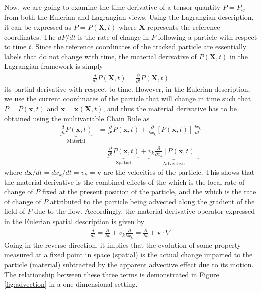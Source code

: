 Now, we are going to examine the time derivative of a tensor quantity $P = P_{ij\ldots}$ from both the Eulerian and Lagrangian views. Using the Lagrangian description, it can be expressed as $P = P(\textbf{X}, t)$ where $\textbf{X}$ represents the reference coordinates. The  $dP/dt$ is the rate of change in $P$ following a particle with respect to time $t$. Since the reference coordinates of the tracked particle are essentially labels that do not change with time, the material derivative of $P(\textbf{X}, t)$ in the Lagrangian framework is simply
\begin{align}
\frac{d}{dt} P(\textbf{X},t) = \frac{\partial}{\partial t} P(\textbf{X},t) \label{eqn:lagpartialt}
\end{align}
its partial derivative with respect to time. However, in the Eulerian description, we use the current coordinates of the particle that will change in time such that $P = P(\textbf{x}, t)$ and $\textbf{x} = \textbf{x}(\textbf{X}, t)$, and thus the material derivative has to be obtained using the multivariable Chain Rule as
\begin{align}
\underbrace{\frac{d}{dt} P(\textbf{x},t)}_{\text{Material}} &= \frac{\partial}{\partial t} P(\textbf{x},t) + \frac{\partial}{\partial x_k} [P(\textbf{x},t)] \frac{dx_k}{dt} \nonumber \\
&= \underbrace{\frac{\partial}{\partial t} P(\textbf{x},t)}_{\text{Spatial}} + \underbrace{v_k\frac{\partial}{\partial x_k} [P(\textbf{x},t)]}_{\text{Advective}} 
\end{align}
where $d\textbf{x}/dt = dx_k/dt = v_k = \textbf{v}$ are the velocities of the particle. This shows that the material derivative is the combined effects of the  which is the local rate of change of $P$ fixed at the present position of the particle, and the  which is the rate of change of $P$ attributed to the particle being advected along the gradient of the field of $P$ due to the flow. Accordingly, the material derivative operator expressed in the Eulerian spatial description is given by 
\begin{align}
\frac{d}{dt} = \frac{\partial}{\partial t} + v_k\frac{\partial}{\partial x_k} = \frac{\partial}{\partial t} + \textbf{v} \cdot \nabla \label{eqn:localmatderiv}
\end{align}
Going in the reverse direction, it implies that the evolution of some property measured at a fixed point in space (spatial) is the actual change imparted to the particle (material) subtracted by the apparent advective effect due to its motion. The relationship between these three terms is demonstrated in Figure \ref{fig:advection} in a one-dimensional setting.
